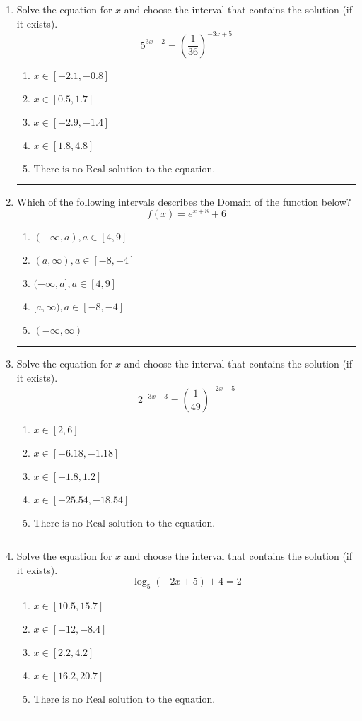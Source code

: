 \documentclass[14pt]{extbook}
\newcommand{\litem}[1]{\item#1\hspace*{-1cm}\rule{\textwidth}{0.4pt}}
\begin{document}
\begin{enumerate}
\litem{
Solve the equation for $x$ and choose the interval that contains the solution (if it exists).\[ 5^{3x-2} = \left(\frac{1}{36}\right)^{-3x+5} \]\begin{enumerate}[label=\Alph*.]
\item \( x \in [-2.1, -0.8] \)
\item \( x \in [0.5, 1.7] \)
\item \( x \in [-2.9, -1.4] \)
\item \( x \in [1.8, 4.8] \)
\item \( \text{There is no Real solution to the equation.} \)

\end{enumerate} }
\litem{
Which of the following intervals describes the Domain of the function below?\[ f(x) = e^{x+8}+6 \]\begin{enumerate}[label=\Alph*.]
\item \( (-\infty, a), a \in [4, 9] \)
\item \( (a, \infty), a \in [-8, -4] \)
\item \( (-\infty, a], a \in [4, 9] \)
\item \( [a, \infty), a \in [-8, -4] \)
\item \( (-\infty, \infty) \)

\end{enumerate} }
\litem{
Solve the equation for $x$ and choose the interval that contains the solution (if it exists).\[ 2^{-3x-3} = \left(\frac{1}{49}\right)^{-2x-5} \]\begin{enumerate}[label=\Alph*.]
\item \( x \in [2, 6] \)
\item \( x \in [-6.18, -1.18] \)
\item \( x \in [-1.8, 1.2] \)
\item \( x \in [-25.54, -18.54] \)
\item \( \text{There is no Real solution to the equation.} \)

\end{enumerate} }
\litem{
Solve the equation for $x$ and choose the interval that contains the solution (if it exists).\[ \log_{5}{(-2x+5)}+4 = 2 \]\begin{enumerate}[label=\Alph*.]
\item \( x \in [10.5, 15.7] \)
\item \( x \in [-12, -8.4] \)
\item \( x \in [2.2, 4.2] \)
\item \( x \in [16.2, 20.7] \)
\item \( \text{There is no Real solution to the equation.} \)


\end{enumerate}}
\end{enumerate}
\end{document}
